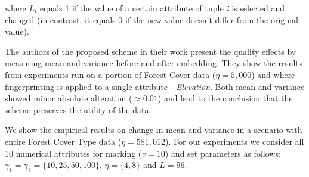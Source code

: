 where $L_i$ equals 1 if the value of a certain attribute of tuple \textit{i} is selected and changed (in contrast, it equals 0 if the new value doesn't differ from the original value).

The authors of the proposed scheme in their work \cite{guo2006fragile} present the quality effects by measuring mean and variance before and after embedding. 
They show the results from experiments run on a portion of Forest Cover data ($\eta=5,000$) and where fingerprinting is applied to a single attribute - \textit{Elevation}. 
Both mean and variance showed minor absolute alteration ($\approx0.01$) and lead to the conclusion that the scheme preserves the utility of the data. 

We show the empirical results on change in mean and variance in a scenario with entire Forest Cover Type data ($\eta=581,012$). 
For our experiments we consider all 10 numerical attributes for marking ($v=10$) and set parameters as follows: $\gamma_1=\gamma_2=\{10, 25, 50, 100\}$, $\eta=\{4, 8\}$ and $L=96$.

\begin{table}[ht]
\centering
\caption{Change in variance introduced by fingerprinting using the Two-level Fingerprinting Scheme}
\label{table:two-level-mean-var}
\end{table}

